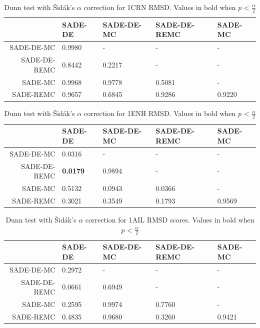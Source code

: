 \begin{table}[ht!]
  \centering
  \begin{tabular}{ r | l | l | l | l } \cline{2-5}
              & SADE-DE & SADE-DE-MC & SADE-DE-REMC & SADE-MC     \\ \hline \hline
   SADE-DE-MC & 0.9980  & -          & -            & -      \\ \hline
 SADE-DE-REMC & 0.8442  & 0.2217     & -            & -      \\ \hline
      SADE-MC & 0.9968  & 0.9778     & 0.5081       & -      \\ \hline
    SADE-REMC & 0.9657  & 0.6845     & 0.9286       & 0.9220 \\ \hline \hline
  \end{tabular}
  \caption{Dunn test with \v{S}idák's $\alpha$ correction for 1CRN RMSD. Values in bold when $p$ < $\frac{\alpha}{2}$}
  \label{tab:1crn-dunn-rmsd}
\end{table}

\begin{table}[ht!]
  \centering
  \begin{tabular}{ r | l | l | l | l } \cline{2-5}
                 & SADE-DE         & SADE-DE-MC & SADE-DE-REMC    & SADE-MC \\ \hline \hline
   SADE-DE-MC    & 0.0316          & -          & -               & -       \\ \hline \hline
 SADE-DE-REMC    & \textbf{0.0179} & 0.9894     & -               & -       \\ \hline
      SADE-MC    & 0.5132          & 0.0943     & 0.0366          & -       \\ \hline
    SADE-REMC    & 0.3021          & 0.3549     & 0.1793          & 0.9569  \\ \hline \hline
  \end{tabular}
  \caption{Dunn test with \v{S}idák's $\alpha$ correction for 1ENH RMSD. Values in bold when $p$ < $\frac{\alpha}{2}$}
  \label{tab:1enh-dunn-rmsd}
\end{table}

\begin{table}[ht!]
  \centering
  \begin{tabular}{ r | l | l | l | l } \cline{2-5}
              & SADE-DE & SADE-DE-MC & SADE-DE-REMC & SADE-MC \\ \hline
   SADE-DE-MC & 0.2972  & -          & -            & -       \\ \hline
 SADE-DE-REMC & 0.0661  & 0.6949     & -            & -       \\ \hline
      SADE-MC & 0.2595  & 0.9974     & 0.7760       & -       \\ \hline
    SADE-REMC & 0.4835  & 0.9680     & 0.3260       & 0.9421  \\ \hline \hline
  \end{tabular}
  \caption{Dunn test with \v{S}idák's $\alpha$ correction for 1AIL RMSD scores. Values in bold when $p$ < $\frac{\alpha}{2}$}
  \label{tab:1ail-dunn-rmsd}
\end{table}

